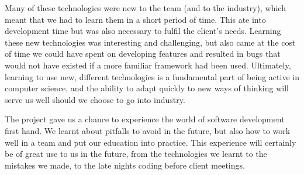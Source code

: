 \documentclass{l3proj}
\begin{document}
Many of these technologies were new to the team (and to the industry),
 which meant that we had to learn them in a short period of time. This
 ate into development time but was also necessary to fulfil the client's
 needs. Learning these new technologies was interesting and challenging,
 but also came at the cost of time we could have spent on developing
 features and resulted in bugs that would not have existed if a more
 familiar framework had been used. Ultimately, learning to use new, different
 technologies is a fundamental part of being active in computer science,
 and the ability to adapt quickly to new ways of thinking will serve us well
 should we choose to go into industry.

The project gave us a chance to experience the world of software development
 first hand. We learnt about pitfalls to avoid in the future, but also how
 to work well in a team and put our education into practice. This experience
 will certainly be of great use to us in the future, from the technologies we
 learnt to the mistakes we made, to the late nights coding before client meetings.

\newpage

\end{document}
